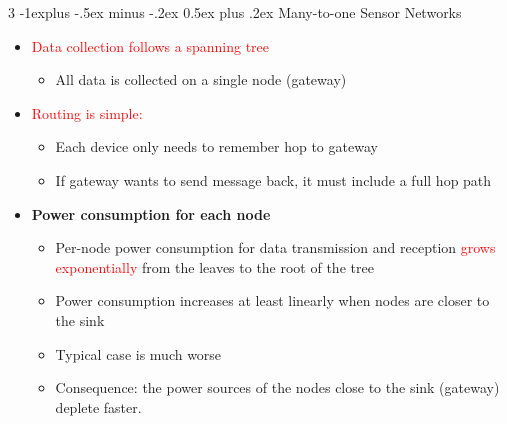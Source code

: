 \documentclass[a4paper, 9pt, landscape]{extarticle}
\makeatletter
\renewcommand{\subsection}{\@startsection{subsection}{2}{0mm}%
                                {-1explus -.5ex minus -.2ex}%
                                {0.5ex plus .2ex}%
                                {\normalfont\normalsize\bfseries}}
\makeatother
\begin{document}
\begin{multicols*}{3}
\subsection{Many-to-one Sensor Networks}
\begin{itemize}
  \item \textcolor{red}{Data collection follows a spanning tree}
  \begin{itemize}
    \item All data is collected on a single node (gateway)
  \end{itemize}
  \item \textcolor{red}{Routing is simple:}
  \begin{itemize}
    \item Each device only needs to remember hop to gateway
    \item If gateway wants to send message back, it must include a full hop path
  \end{itemize}
  \item \textbf{Power consumption for each node}
  \begin{itemize}
    \item Per-node power consumption for data transmission and reception \textcolor{red}{grows exponentially} from the leaves to the root of the tree
    \item Power consumption increases at least linearly when nodes are closer to the sink
    \item Typical case is much worse
    \item Consequence: the power sources of the nodes close to the sink (gateway) deplete faster.
  \end{itemize}
\end{itemize}

\begin{center}
\end{center}
\end{multicols*}
\end{document}
